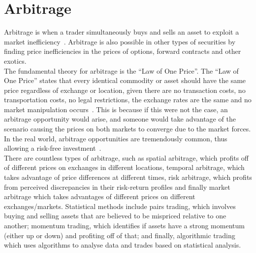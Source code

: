 \section{Arbitrage}
Arbitrage is when a trader simultaneously buys and sells an asset to exploit a market inefficiency~\cite{businessinsightsblog_2021}. Arbitrage is also possible in other types of securities by finding price inefficiencies in the prices of options, forward contracts and other exotics.
\\[3mm]
The fundamental theory for arbitrage is the ``Law of One Price''. The ``Law of One Price'' states that every identical commodity or asset should have the same price regardless of exchange or location, given there are no transaction costs, no transportation costs, no legal restrictions, the exchange rates are the same and no market manipulation occurs~\cite{noauthor_law_nodate}. This is because if this were not the case, an arbitrage opportunity would arise, and someone would take advantage of the scenario causing the prices on both markets to converge due to the market forces. In the real world, arbitrage opportunities are tremendously common, thus allowing a risk-free investment~\cite{10.2307/1828075, RICHARDSON1978341}.
\\[3mm]
There are countless types of arbitrage, such as spatial arbitrage, which profits off of different prices on exchanges in different locations, temporal arbitrage, which takes advantage of price differences at different times, risk arbitrage, which profits from perceived discrepancies in their risk-return profiles and finally market arbitrage which takes advantages of different prices on different exchanges/markets. Statistical methods include pairs trading, which involves buying and selling assets that are believed to be mispriced relative to one another; momentum trading, which identifies if assets have a strong momentum (either up or down) and profiting off of that; and finally, algorithmic trading which uses algorithms to analyse data and trades based on statistical analysis.

